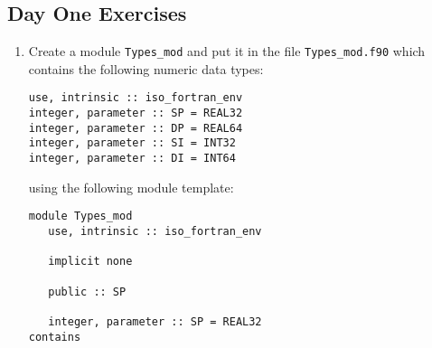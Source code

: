 \documentclass[12pt]{article}
\begin{document}
\subsection*{Day One Exercises}
\setdefaultleftmargin{0pt}{}{}{}{}{}
\begin{enumerate}
\item Create a module \texttt{Types\_mod} and put it in the file \texttt{Types\_mod.f90} which 
contains the following numeric data types:
\begin{verbatim}
use, intrinsic :: iso_fortran_env
integer, parameter :: SP = REAL32
integer, parameter :: DP = REAL64
integer, parameter :: SI = INT32
integer, parameter :: DI = INT64
\end{verbatim}
using the following module template:
\begin{verbatim}
module Types_mod
   use, intrinsic :: iso_fortran_env

   implicit none

   public :: SP

   integer, parameter :: SP = REAL32
contains


\end{verbatim}
\end{enumerate}
\end{document}
